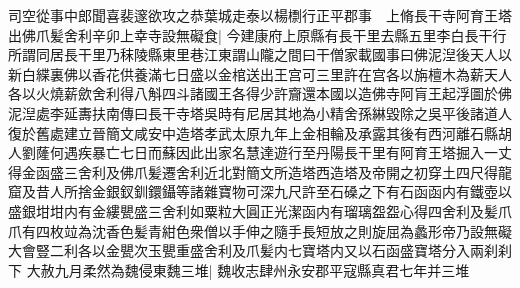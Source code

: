司空從事中郎聞喜裴邃欲攻之恭葉城走泰以楊檦行正平郡事　上脩長干寺阿育王塔出佛爪髪舍利辛卯上幸寺設無礙食|{
	今建康府上原縣有長干里去縣五里李白長干行所謂同居長干里乃秣陵縣東里巷江東謂山隴之間曰干僧家載國事曰佛泥湼後天人以新白緤裏佛以香花供養滿七日盛以金棺送出王宫可三里許在宫各以旃檀木為薪天人各以火燒薪歛舍利得八斛四斗諸國王各得少許齎還本國以造佛寺阿肓王起浮圖於佛泥湼處李延夀扶南傳曰長干寺塔吳時有尼居其地為小精舍孫綝毀除之吳平後諸道人復於舊處建立晉簡文咸安中造塔孝武太原九年上金相輪及承露其後有西河離石縣胡人劉蕯何遇疾暴亡七日而蘇因此出家名慧達遊行至丹陽長干里有阿育王塔掘入一丈得金函盛三舍利及佛爪髪遷舍利近北對簡文所造塔西造塔及帝開之初穿土四尺得龍窟及昔人所捨金銀釵釧鐶鑷等諸雜寶物可深九尺許至石磉之下有石函函内有鐵壺以盛銀坩坩内有金縷甖盛三舍利如粟粒大圓正光潔函内有瑠璃盌盌心得四舍利及髪爪爪有四枚竝為沈香色髪青紺色衆僧以手伸之隨手長短放之則旋屈為蠡形帝乃設無礙大會豎二利各以金甖次玉甖重盛舍利及爪髪内七寶塔内又以石函盛寶塔分入兩刹刹下}
大赦九月柔然為魏侵東魏三堆|{
	魏收志肆州永安郡平寇縣真君七年并三堆}


